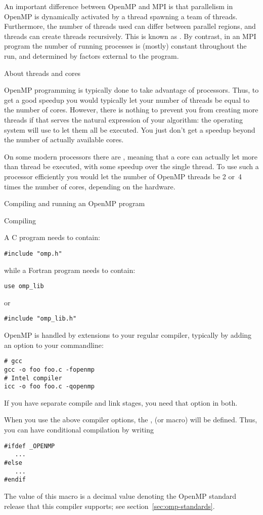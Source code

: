 An important difference between OpenMP and MPI is that parallelism in
OpenMP is dynamically activated by a thread spawning a team of
threads. Furthermore,
the number of threads used can differ between parallel regions, and
threads can create threads recursively. This is known as
. By contrast, in an MPI program the number
of running processes is (mostly) constant throughout the run, and
determined by factors external to the program.

 {About threads and cores}

OpenMP programming is typically done to take advantage of
 processors. Thus, to get a good speedup you
would typically let your number of threads be equal to the number of
cores. However, there is nothing to prevent you from creating more
threads if that serves the natural expression of your algorithm:
the operating system will use  to let
them all be executed. You just don't get a speedup beyond the number
of actually available cores.

On some modern processors there are ,
meaning that a core can actually let more than thread be executed,
with some speedup over the single thread. To use such a processor
efficiently you would let the number of OpenMP threads be
2 or~4 times the number of cores, depending on the hardware.

 {Compiling and running an OpenMP program}

 {Compiling}

A C program needs to contain:
\begin{lstlisting}
#include "omp.h"
\end{lstlisting}
while a Fortran program needs to contain:
\begin{lstlisting}
use omp_lib
\end{lstlisting}
or
\begin{lstlisting}
#include "omp_lib.h"
\end{lstlisting}

OpenMP is handled by extensions to your regular compiler, typically by
adding an option to your commandline:
\begin{verbatim}
# gcc
gcc -o foo foo.c -fopenmp
# Intel compiler
icc -o foo foo.c -qopenmp
\end{verbatim}
If you have separate compile and link stages, you need that option in both.

When you use the above compiler options,
the ,
(or   macro)
will be defined. Thus, you can have conditional compilation by writing
\begin{lstlisting}
#ifdef _OPENMP
   ...
#else
   ...
#endif
\end{lstlisting}
The value of this macro is a decimal value  denoting the OpenMP standard release
that this compiler supports;
see section~\ref{sec:omp-standards}.

